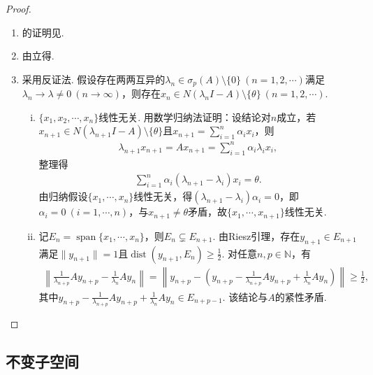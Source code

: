 \documentclass[../../main.tex]{subfiles}%
\begin{document}
\begin{proof}
\begin{enumerate}[(1)]
\item 的证明见.

\item 由立得.

\item 采用反证法.
假设存在两两互异的$\lambda_n\in\sigma_p(A)\setminus\{0\}\ (n=1,2,\cdots)$满足$\lambda_n\to\lambda\neq0\ (n\to\infty)$，则存在$x_n\in N(\lambda_n I-A)\setminus\{\theta\}\ (n=1,2,\cdots)$.
\begin{enumerate}[(i)]
\item $\{x_1,x_2,\cdots,x_n\}$线性无关.
用数学归纳法证明：设结论对$n$成立，若$x_{n+1}\in N(\lambda_{n+1}I-A)\setminus\{\theta\}$且$x_{n+1}=\sum\limits_{i=1}^n\alpha_i x_i$，则
\begin{align*}
\lambda_{n+1}x_{n+1}=Ax_{n+1}=\sum\limits_{i=1}^n\alpha_i\lambda_i x_i,
\end{align*}
整理得
\begin{align*}
\sum\limits_{i=1}^n\alpha_i(\lambda_{n+1}-\lambda_i)x_i=\theta.
\end{align*}
由归纳假设$\{x_1,\cdots,x_n\}$线性无关，得$(\lambda_{n+1}-\lambda_i)\alpha_i=0$，即$\alpha_i=0\ (i=1,\cdots,n)$，与$x_{n+1}\neq\theta$矛盾，故$\{x_1,\cdots,x_{n+1}\}$线性无关.

\item 记$E_n=\operatorname{span}\{x_1,\cdots,x_n\}$，则$E_n\subsetneq E_{n+1}$.
由Riesz引理，存在$y_{n+1}\in E_{n+1}$满足$\|y_{n+1}\|=1$且$\operatorname{dist}(y_{n+1},E_n)\geqslant\frac12$.
对任意$n,p\in\mathbb{N}$，有
\begin{align*}
\left\|\frac{1}{\lambda_{n+p}}Ay_{n+p}-\frac{1}{\lambda_n}Ay_n\right\|
=\left\|y_{n+p}-\left(y_{n+p}-\frac{1}{\lambda_{n+p}}Ay_{n+p}+\frac{1}{\lambda_n}Ay_n\right)\right\|
\geqslant\frac12,
\end{align*}
其中$y_{n+p}-\frac{1}{\lambda_{n+p}}Ay_{n+p}+\frac{1}{\lambda_n}Ay_n\in E_{n+p-1}$.
该结论与$A$的紧性矛盾.
\end{enumerate}
\end{enumerate}
\end{proof}

\subsection{不变子空间}
\end{document}
